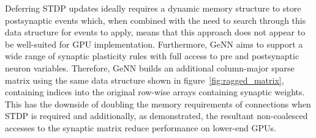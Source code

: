 \documentclass[utf8]{frontiersSCNS} %
\begin{document}
Deferring STDP updates ideally requires a dynamic memory structure to store postsynaptic events which, when combined with the need to search through this data structure for events to apply, means that this approach does not appear to be well-suited for GPU implementation.
Furthermore, GeNN aims to support a wide range of synaptic plasticity rules with full access to pre and postsynaptic neuron variables.
Therefore, GeNN builds an additional column-major sparse matrix using the same data structure shown in figure~\ref{fig:ragged_matrix}, containing indices into the original row-wise arrays containing synaptic weights.
This has the downside of doubling the memory requirements of connections when STDP is required and additionally, as \citet{Yavuz2016} demonstrated, the resultant non-coalesced accesses to the synaptic matrix reduce performance on lower-end GPUs.
\end{document}
